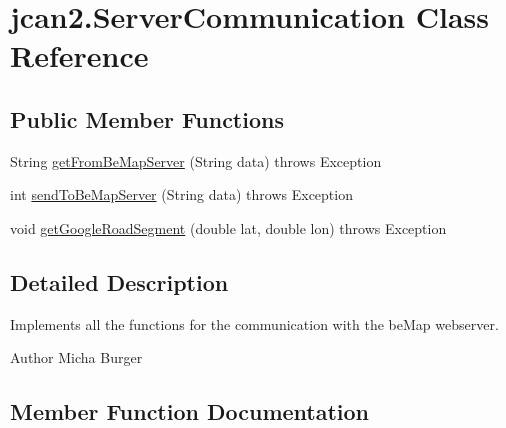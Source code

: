 \hypertarget{classjcan2_1_1_server_communication}{}\section{jcan2.\+Server\+Communication Class Reference}
\label{classjcan2_1_1_server_communication}
\subsection*{Public Member Functions}
\begin{DoxyCompactItemize}
\item 
String \hyperlink{classjcan2_1_1_server_communication_af9ec010ba3907cd44c7264a9ca39b7b4}{get\+From\+Be\+Map\+Server} (String data)  throws Exception 
\item 
int \hyperlink{classjcan2_1_1_server_communication_a1aafa1775b99fa1971c0247abff4aaa8}{send\+To\+Be\+Map\+Server} (String data)  throws Exception 
\item 
void \hyperlink{classjcan2_1_1_server_communication_af319ec6a3c936569fd5fc8420c75c589}{get\+Google\+Road\+Segment} (double lat, double lon)  throws Exception 
\end{DoxyCompactItemize}


\subsection{Detailed Description}
Implements all the functions for the communication with the be\+Map webserver. \begin{DoxyAuthor}{Author}
Micha Burger 
\end{DoxyAuthor}


\subsection{Member Function Documentation}
\hypertarget{classjcan2_1_1_server_communication_af9ec010ba3907cd44c7264a9ca39b7b4}{}
